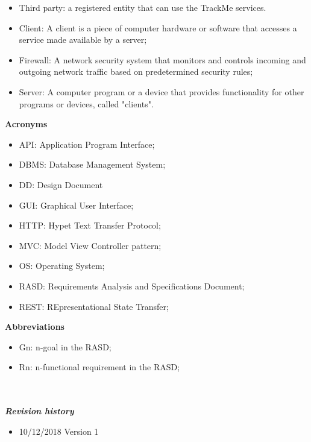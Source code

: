 \begin{legal}
\begin{legal}
\begin{itemize}
					\item Third party: a registered entity that can use the TrackMe services.
					\item Client: A client is a piece of computer hardware or software that accesses a service made available by a server;
					\item Firewall: A network security system that monitors and controls incoming and outgoing network traffic based on predetermined security rules;
					\item Server: A computer program or a device that provides functionality for other programs or devices, called "clients".\\
				\end{itemize}
				\item \textbf{Acronyms}\\
				\begin{itemize}
					\item API: Application Program Interface;
					\item DBMS: Database Management System;
					\item DD: Design Document
					\item GUI: Graphical User Interface;
					\item HTTP: Hypet Text Transfer Protocol;
					\item MVC: Model View Controller pattern;
					\item OS: Operating System;
					\item RASD: Requirements Analysis and Specifications Document;
					\item REST: REpresentational State Transfer;\\
				\end{itemize}
				\item \textbf{Abbreviations}\\
				\begin{itemize}
					\item Gn: n-goal in the RASD;
					\item Rn: n-functional requirement in the RASD;\\\\\\
				\end{itemize}
			\end{legal}
		\item \textit{\textbf{Revision history}}\\
			\begin{itemize}
				\item 10/12/2018		Version 1\\

\end{itemize}
\end{legal}

